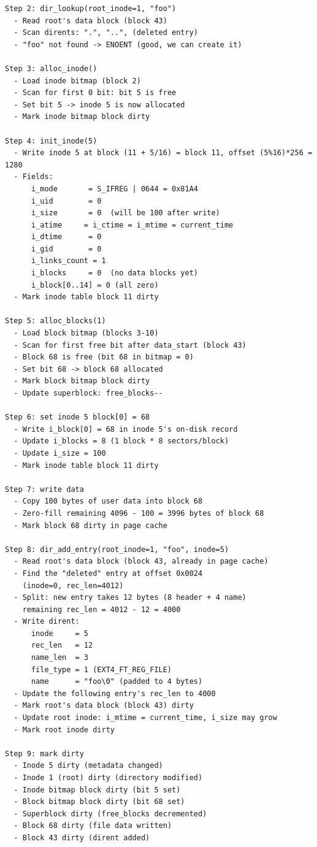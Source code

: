 \begin{filesystemlayout}
\begin{lstlisting}
Step 2: dir_lookup(root_inode=1, "foo")
  - Read root's data block (block 43)
  - Scan dirents: ".", "..", (deleted entry)
  - "foo" not found -> ENOENT (good, we can create it)

Step 3: alloc_inode()
  - Load inode bitmap (block 2)
  - Scan for first 0 bit: bit 5 is free
  - Set bit 5 -> inode 5 is now allocated
  - Mark inode bitmap block dirty

Step 4: init_inode(5)
  - Write inode 5 at block (11 + 5/16) = block 11, offset (5%16)*256 = 1280
  - Fields:
      i_mode       = S_IFREG | 0644 = 0x81A4
      i_uid        = 0
      i_size       = 0  (will be 100 after write)
      i_atime     = i_ctime = i_mtime = current_time
      i_dtime      = 0
      i_gid        = 0
      i_links_count = 1
      i_blocks     = 0  (no data blocks yet)
      i_block[0..14] = 0 (all zero)
  - Mark inode table block 11 dirty

Step 5: alloc_blocks(1)
  - Load block bitmap (blocks 3-10)
  - Scan for first free bit after data_start (block 43)
  - Block 68 is free (bit 68 in bitmap = 0)
  - Set bit 68 -> block 68 allocated
  - Mark block bitmap block dirty
  - Update superblock: free_blocks--

Step 6: set inode 5 block[0] = 68
  - Write i_block[0] = 68 in inode 5's on-disk record
  - Update i_blocks = 8 (1 block * 8 sectors/block)
  - Update i_size = 100
  - Mark inode table block 11 dirty

Step 7: write data
  - Copy 100 bytes of user data into block 68
  - Zero-fill remaining 4096 - 100 = 3996 bytes of block 68
  - Mark block 68 dirty in page cache

Step 8: dir_add_entry(root_inode=1, "foo", inode=5)
  - Read root's data block (block 43, already in page cache)
  - Find the "deleted" entry at offset 0x0024
    (inode=0, rec_len=4012)
  - Split: new entry takes 12 bytes (8 header + 4 name)
    remaining rec_len = 4012 - 12 = 4000
  - Write dirent:
      inode     = 5
      rec_len   = 12
      name_len  = 3
      file_type = 1 (EXT4_FT_REG_FILE)
      name      = "foo\0" (padded to 4 bytes)
  - Update the following entry's rec_len to 4000
  - Mark root's data block (block 43) dirty
  - Update root inode: i_mtime = current_time, i_size may grow
  - Mark root inode dirty

Step 9: mark dirty
  - Inode 5 dirty (metadata changed)
  - Inode 1 (root) dirty (directory modified)
  - Inode bitmap block dirty (bit 5 set)
  - Block bitmap block dirty (bit 68 set)
  - Superblock dirty (free_blocks decremented)
  - Block 68 dirty (file data written)
  - Block 43 dirty (dirent added)


\end{lstlisting}
\end{filesystemlayout}
